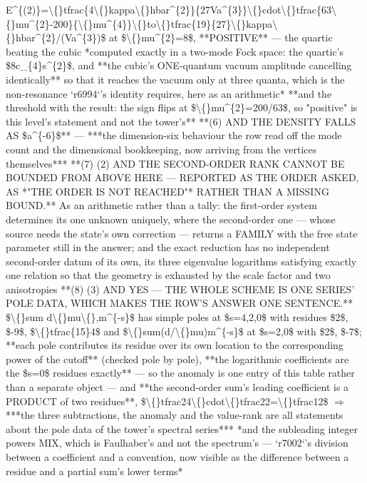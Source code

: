 \begin{description}
E\textasciicircum{}\{(2)\}=\textbackslash\{\}tfrac\{4\textbackslash\{\}kappa\textbackslash\{\}hbar\textasciicircum{}\{2\}\}\{27Va\textasciicircum{}\{3\}\}\textbackslash\{\}cdot\textbackslash\{\}tfrac\{63\textbackslash\{\}mu\textasciicircum{}\{2\}-200\}\{\textbackslash\{\}mu\textasciicircum{}\{4\}\}\textbackslash\{\}to\textbackslash\{\}tfrac\{19\}\{27\}\textbackslash\{\}kappa\textbackslash\{\}hbar\textasciicircum{}\{2\}/(Va\textasciicircum{}\{3\})\$ at \$\textbackslash\{\}mu\textasciicircum{}\{2\}=8\$, **POSITIVE** --- the quartic beating the cubic  *computed exactly in a two-mode Fock space: the quartic's \$8c\_\{4\}s\textasciicircum{}\{2\}\$, and **the cubic's ONE-quantum vacuum amplitude cancelling identically** so that it reaches the vacuum only at three quanta, which is the non-resonance `r6994`'s identity requires, here as an arithmetic*  **and the threshold with the result: the sign flips at \$\textbackslash\{\}mu\textasciicircum{}\{2\}=200/63\$, so "positive" is this level's statement and not the tower's**  **(6) AND THE DENSITY FALLS AS \$a\textasciicircum{}\{-6\}\$** --- ***the dimension-six behaviour the row read off the mode count and the dimensional bookkeeping, now arriving from the vertices themselves***  **(7) (2) AND THE SECOND-ORDER RANK CANNOT BE BOUNDED FROM ABOVE HERE --- REPORTED AS THE ORDER ASKED, AS *"THE ORDER IS NOT REACHED"* RATHER THAN A MISSING BOUND.** As an arithmetic rather than a tally: the first-order system determines its one unknown uniquely, where the second-order one --- whose source needs the state's own correction --- returns a FAMILY with the free state parameter still in the answer; and the exact reduction has no independent second-order datum of its own, its three eigenvalue logarithms satisfying exactly one relation so that the geometry is exhausted by the scale factor and two anisotropies  **(8)  (3) AND YES --- THE WHOLE SCHEME IS ONE SERIES' POLE DATA, WHICH MAKES THE ROW'S ANSWER ONE SENTENCE.** \$\textbackslash\{\}sum d\textbackslash\{\}mu\textbackslash\{\},m\textasciicircum{}\{-s\}\$ has simple poles at \$s=4,2,0\$ with residues \$2\$, \$-9\$, \$\textbackslash\{\}tfrac\{15\}4\$ and \$\textbackslash\{\}sum(d/\textbackslash\{\}mu)m\textasciicircum{}\{-s\}\$ at \$s=2,0\$ with \$2\$, \$-7\$; **each pole contributes its residue over its own location to the corresponding power of the cutoff** (checked pole by pole), **the logarithmic coefficients are the \$s=0\$ residues exactly** --- so the anomaly is one entry of this table rather than a separate object --- and **the second-order sum's leading coefficient is a PRODUCT of two residues**, \$\textbackslash\{\}tfrac24\textbackslash\{\}cdot\textbackslash\{\}tfrac22=\textbackslash\{\}tfrac12\$ \ensuremath{\Rightarrow} ***the three subtractions, the anomaly and the value-rank are all statements about the pole data of the tower's spectral series***  *and the subleading integer powers MIX, which is Faulhaber's and not the spectrum's --- `r7002`'s division between a coefficient and a convention, now visible as the difference between a residue and a partial sum's lower terms*

\end{description}
